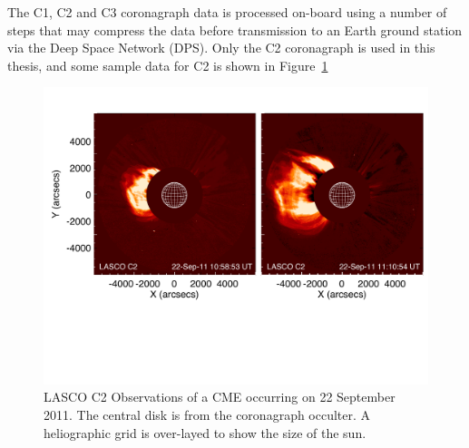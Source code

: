 The C1, C2 and C3 coronagraph data is processed on-board using a number of steps that may compress the data before transmission to an Earth ground station
via the Deep Space Network (DPS). 
Only the C2 coronagraph is used in this thesis, and some sample data for C2 is shown in Figure~\ref{fig:lasco_c2_obs}
\begin{figure}[!t]
\begin{center}
\includegraphics[scale=0.55, trim=2cm 6cm 1cm 2cm]{images/lasco_c2_thesis.pdf}
\caption[LASCO C2 Observations]{LASCO C2 Observations of a CME occurring on 22 September 2011. The central disk is from the coronagraph occulter. A heliographic grid is over-layed to show the size of the sun.}
\label{fig:lasco_c2_obs}
\end{center}
\end{figure}


